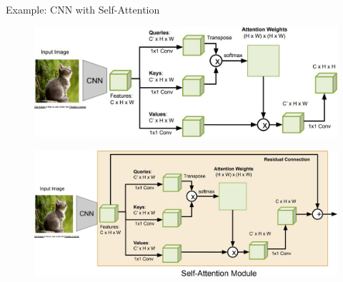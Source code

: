 \begin{frame}[allowframebreaks]{Example: CNN with Self-Attention}
    \framebreak

    \begin{figure}
        \flushleft
        \includegraphics[width=0.95\linewidth,height=\textheight,keepaspectratio]{images/transformers/slide_53_1_img.jpg}
    \end{figure}

    \framebreak

    \begin{figure}
        \flushleft
        \includegraphics[width=1.05\linewidth,height=\textheight,keepaspectratio]{images/transformers/slide_54_1_img.jpg}
    \end{figure}
\end{frame}